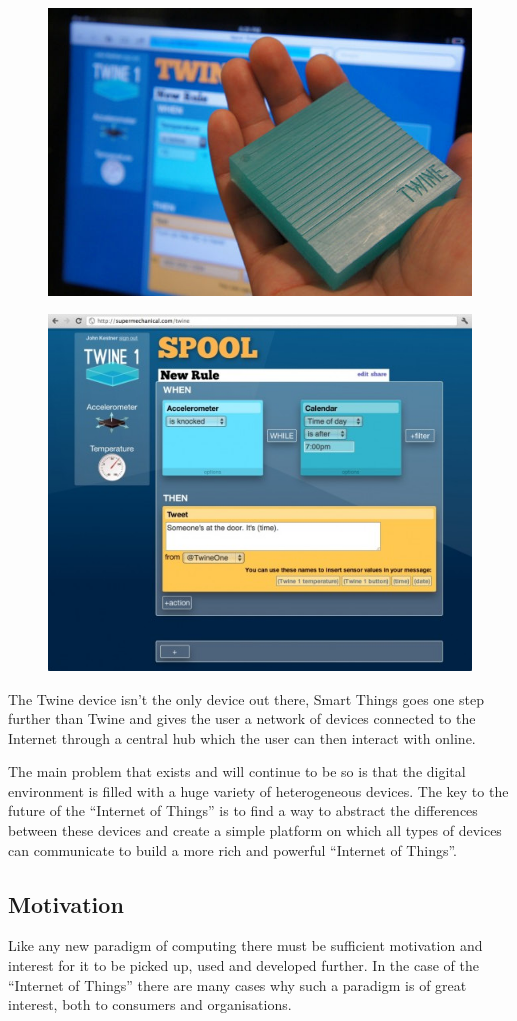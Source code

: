 \begin{figure}[h]
	\centering
	\begin{minipage}{.5\textwidth}
		\includegraphics[width=.6\linewidth]{images/twine-device.jpg}
		\label{fig:twine_device}
	\end{minipage}%
	\begin{minipage}{.5\textwidth}
		\includegraphics[width=.6\linewidth]{images/twine-rules.jpg}
	\end{minipage}
\end{figure}

The Twine device isn't the only device out there, Smart Things\cite{SmartThings} goes one step further than Twine and gives the user a network of devices connected to the Internet through a central hub which the user can then interact with online.

The main problem that exists and will continue to be so is that the digital environment is filled with a huge variety of heterogeneous devices. The key to the future of the ``Internet of Things'' is to find a way to abstract the differences between these devices and create a simple platform on which all types of devices can communicate to build a more rich and powerful ``Internet of Things''.
\newpage
\subsection{Motivation} %
\label{sub:motivation}
Like any new paradigm of computing there must be sufficient motivation and interest for it to be picked up, used and developed further. In the case of the ``Internet of Things'' there are many cases why such a paradigm is of great interest, both to consumers and organisations.

